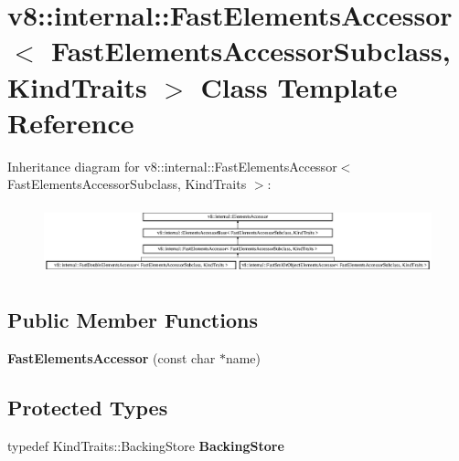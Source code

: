 \hypertarget{classv8_1_1internal_1_1_fast_elements_accessor}{}\section{v8\+:\+:internal\+:\+:Fast\+Elements\+Accessor$<$ Fast\+Elements\+Accessor\+Subclass, Kind\+Traits $>$ Class Template Reference}
\label{classv8_1_1internal_1_1_fast_elements_accessor}
Inheritance diagram for v8\+:\+:internal\+:\+:Fast\+Elements\+Accessor$<$ Fast\+Elements\+Accessor\+Subclass, Kind\+Traits $>$\+:\begin{figure}[H]
\begin{center}
\leavevmode
\includegraphics[height=2.014389cm]{classv8_1_1internal_1_1_fast_elements_accessor}
\end{center}
\end{figure}
\subsection*{Public Member Functions}
\begin{DoxyCompactItemize}
\item 
\hypertarget{classv8_1_1internal_1_1_fast_elements_accessor_a7ca008d8d17bf8d6bcc6e6eb44bc93d0}{}{\bfseries Fast\+Elements\+Accessor} (const char $\ast$name)\label{classv8_1_1internal_1_1_fast_elements_accessor_a7ca008d8d17bf8d6bcc6e6eb44bc93d0}

\end{DoxyCompactItemize}
\subsection*{Protected Types}
\begin{DoxyCompactItemize}
\item 
\hypertarget{classv8_1_1internal_1_1_fast_elements_accessor_af1151fcf00ba8d5ef5e2c5181d94d5fb}{}typedef Kind\+Traits\+::\+Backing\+Store {\bfseries Backing\+Store}\label{classv8_1_1internal_1_1_fast_elements_accessor_af1151fcf00ba8d5ef5e2c5181d94d5fb}

\end{DoxyCompactItemize}
